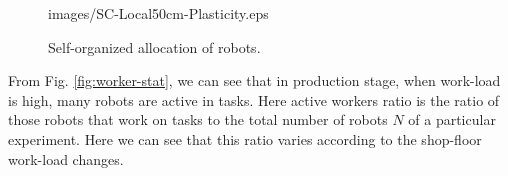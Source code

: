 \documentclass[final,5p,times,twocolumn]{elsarticle}
\begin{document}
\begin{figure}
{{images/SC-Local50cm-Plasticity.eps}}
\newline
{}
\newline
\caption{Self-organized allocation of robots.} 
\end{figure}
From Fig. \ref{fig:worker-stat}, we can  see that in production stage, when work-load is high, many robots are active in tasks. Here active workers ratio is the ratio of those robots that work on tasks to the total number of robots $N$ of a particular experiment.   Here we can see that this ratio varies according to the shop-floor work-load changes.
\end{document}
